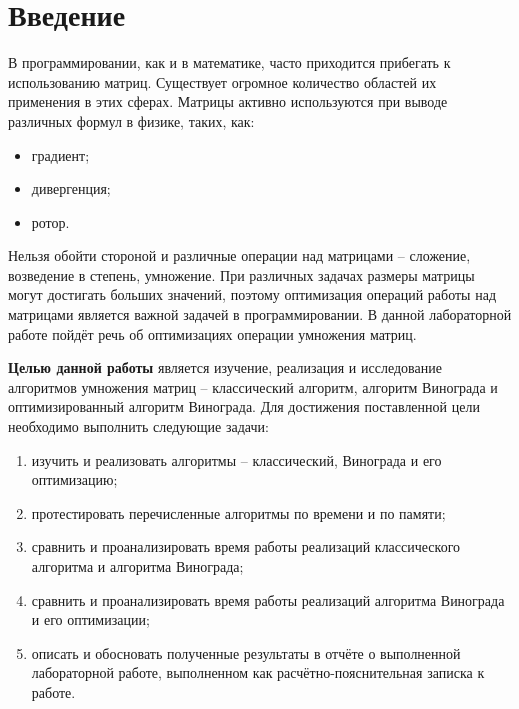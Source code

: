 \chapter*{Введение}

В программировании, как и в математике, часто приходится прибегать к использованию матриц.
Существует огромное количество областей их применения в этих сферах.
Матрицы активно используются при выводе различных формул в физике, таких, как:
\begin{itemize}[label=---]
    \item градиент;
    \item дивергенция;
    \item ротор.
\end{itemize}

Нельзя обойти стороной и различные операции над матрицами -- сложение, возведение в степень, умножение.
При различных задачах размеры матрицы могут достигать больших значений, поэтому оптимизация операций работы над матрицами является важной задачей в программировании.
В данной лабораторной работе пойдёт речь об оптимизациях операции умножения матриц.


\textbf{Целью данной работы} является изучение, реализация и исследование алгоритмов умножения матриц -- классический алгоритм, алгоритм Винограда и оптимизированный алгоритм Винограда.
Для достижения поставленной цели необходимо выполнить следующие задачи:
\begin{enumerate}[label=\arabic*)]
	\item изучить и реализовать алгоритмы -- классический, Винограда и его оптимизацию;
    \item протестировать перечисленные алгоритмы по времени и по памяти;
    \item сравнить и проанализировать время работы реализаций классического алгоритма и алгоритма Винограда;
    \item сравнить и проанализировать время работы реализаций алгоритма Винограда и его оптимизации;
	\item описать и обосновать полученные результаты в отчёте о выполненной лабораторной работе, выполненном как расчётно-пояснительная записка к работе.
\end{enumerate}
